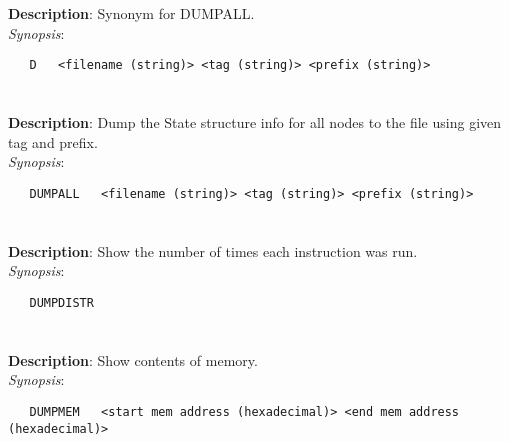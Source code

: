 \section{\quad{}}
\label{manpages:D}
\label{manpages:d}
\vspace{-0.1in}
{\bf Description}: 	Synonym for DUMPALL.\\[1.5ex]
{\em Synopsis}:
\vspace{-0.05in}
\scriptsize
\begin{lstlisting}
   D   <filename (string)> <tag (string)> <prefix (string)>																
\end{lstlisting}
\normalsize
\vspace{-0.05in}


\section{\quad{}}
\label{manpages:DUMPALL}
\label{manpages:dumpall}
\vspace{-0.1in}
{\bf Description}: 	Dump the State structure info for all nodes to the file using given tag and prefix.\\[1.5ex]
{\em Synopsis}:
\vspace{-0.05in}
\scriptsize
\begin{lstlisting}
   DUMPALL   <filename (string)> <tag (string)> <prefix (string)>								
\end{lstlisting}
\normalsize
\vspace{-0.05in}


\section{\quad{}}
\label{manpages:DUMPDISTR}
\label{manpages:dumpdistr}
\vspace{-0.1in}
{\bf Description}: 	Show the number of times each instruction was run.\\[1.5ex]
{\em Synopsis}:
\vspace{-0.05in}
\scriptsize
\begin{lstlisting}
   DUMPDISTR   								
\end{lstlisting}
\normalsize
\vspace{-0.05in}


\section{\quad{}}
\label{manpages:DUMPMEM}
\label{manpages:dumpmem}
\vspace{-0.1in}
{\bf Description}: 	Show contents of memory.\\[1.5ex]
{\em Synopsis}:
\vspace{-0.05in}
\scriptsize
\begin{lstlisting}
   DUMPMEM   <start mem address (hexadecimal)> <end mem address (hexadecimal)>			
\end{lstlisting}
\normalsize
\vspace{-0.05in}


